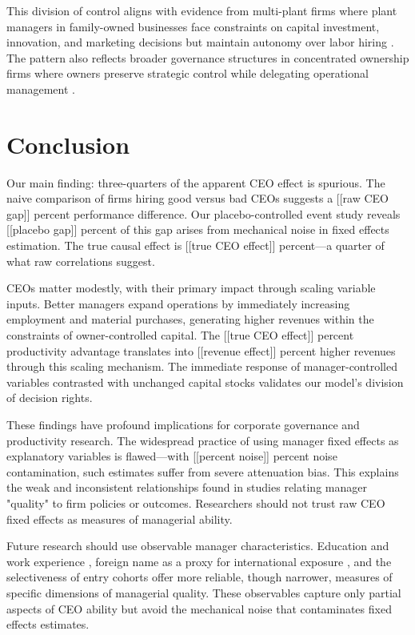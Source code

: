 \documentclass[11pt,a4paper]{article}
\begin{document}
This division of control aligns with evidence from multi-plant firms where plant managers in family-owned businesses face constraints on capital investment, innovation, and marketing decisions but maintain autonomy over labor hiring \citep{bloom2012americans}. The pattern also reflects broader governance structures in concentrated ownership firms where owners preserve strategic control while delegating operational management \citep{zellweger2012managing}.

\section{Conclusion}

Our main finding: three-quarters of the apparent CEO effect is spurious. The naive comparison of firms hiring good versus bad CEOs suggests a [[raw CEO gap]] percent performance difference. Our placebo-controlled event study reveals [[placebo gap]] percent of this gap arises from mechanical noise in fixed effects estimation. The true causal effect is [[true CEO effect]] percent—a quarter of what raw correlations suggest.

CEOs matter modestly, with their primary impact through scaling variable inputs. Better managers expand operations by immediately increasing employment and material purchases, generating higher revenues within the constraints of owner-controlled capital. The [[true CEO effect]] percent productivity advantage translates into [[revenue effect]] percent higher revenues through this scaling mechanism. The immediate response of manager-controlled variables contrasted with unchanged capital stocks validates our model's division of decision rights.

These findings have profound implications for corporate governance and productivity research. The widespread practice of using manager fixed effects as explanatory variables is flawed—with [[percent noise]] percent noise contamination, such estimates suffer from severe attenuation bias. This explains the weak and inconsistent relationships found in studies relating manager "quality" to firm policies or outcomes. Researchers should not trust raw CEO fixed effects as measures of managerial ability.

Future research should use observable manager characteristics. Education and work experience \citep{DePirro2025}, foreign name as a proxy for international exposure \citep{Koren2023expat}, and the selectiveness of entry cohorts \citep{koren2024managers} offer more reliable, though narrower, measures of specific dimensions of managerial quality. These observables capture only partial aspects of CEO ability but avoid the mechanical noise that contaminates fixed effects estimates.
\end{document}
